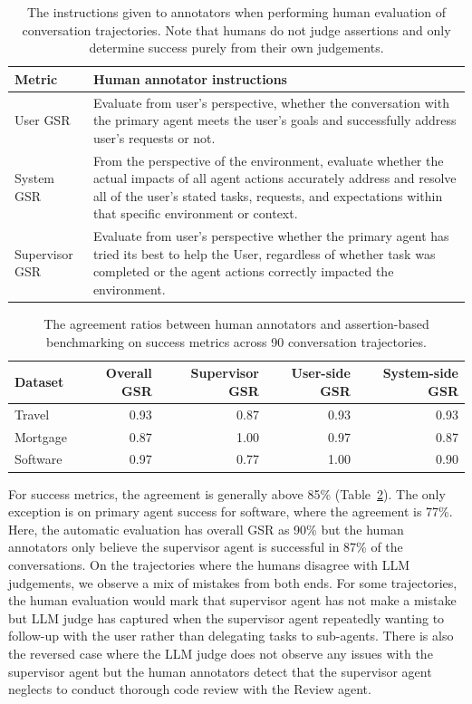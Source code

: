 \begin{table}[t]
    \caption{The instructions given to annotators when performing human evaluation of conversation trajectories. Note that humans do not judge assertions and only determine success purely from their own judgements.}
    \label{tab:human_instructions}
    \centering
    \footnotesize
    \begin{tabular}{p{2cm}p{10cm}}
    \toprule
    Metric & Human annotator instructions \\
    \midrule
    User GSR & Evaluate from user’s perspective, whether the conversation with the primary agent meets the user's goals and successfully address user's requests or not. \\
    System GSR & From the perspective of the environment, evaluate whether the actual impacts of all agent actions accurately address and resolve all of the user's stated tasks, requests, and expectations within that specific environment or context.  \\
    Supervisor GSR & Evaluate from user's perspective whether the primary agent has tried its best to help the User, regardless of whether task was completed or the agent actions correctly impacted the environment. \\
    \bottomrule
    \end{tabular}
\end{table}

\begin{table}[t]
    \caption{The agreement ratios between human annotators and assertion-based benchmarking on success metrics across 90 conversation trajectories.}
    \label{tab:human_agreement}
    \centering
    \footnotesize
    \begin{tabular}{lrrrr}
    \toprule
    Dataset & Overall GSR & Supervisor GSR & User-side GSR & System-side GSR \\
    \midrule 
    Travel & 0.93 & 0.87 & 0.93 & 0.93 \\
    Mortgage & 0.87 & 1.00 & 0.97 & 0.87 \\
    Software & 0.97 & 0.77 & 1.00 & 0.90 \\
    \bottomrule
    \end{tabular}
\end{table}

For success metrics, the agreement is generally above 85\% (Table~\ref{tab:human_agreement}). The only exception is on primary agent success for software, where the agreement is 77\%. Here, the automatic evaluation has overall GSR as 90\% but the human annotators only believe the supervisor agent is successful in 87\% of the conversations. On the trajectories where the humans disagree with LLM judgements, we observe a mix of mistakes from both ends. For some trajectories, the human evaluation would mark that supervisor agent has not make a mistake but LLM judge has captured when the supervisor agent repeatedly wanting to follow-up with the user rather than delegating tasks to sub-agents. There is also the reversed case where the LLM judge does not observe any issues with the supervisor agent but the human annotators detect that the supervisor agent neglects to conduct thorough code review with the Review agent.

